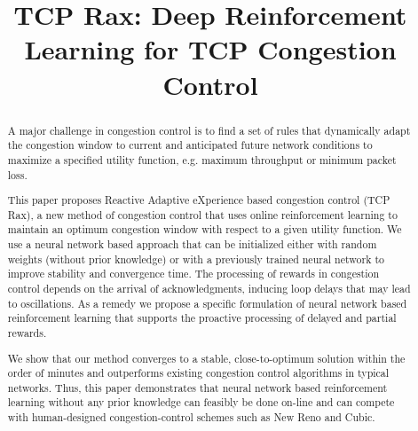\documentclass[sigconf]{acmart}
\begin{document}
\title{TCP Rax: Deep Reinforcement Learning for TCP Congestion Control}

%
%


\begin{abstract}

A major challenge in congestion control is to find a set of rules that dynamically adapt the congestion window to current and anticipated future network conditions to maximize a specified utility function, e.g. maximum throughput or minimum packet loss. 

This paper proposes Reactive Adaptive eXperience based congestion control (TCP Rax), a new method of congestion control that uses online reinforcement learning to maintain an optimum congestion window with respect to a given utility function. We use a neural network based approach that can be initialized either with random weights (without prior knowledge) or with a previously trained neural network to improve stability and convergence time. The processing of rewards in congestion control depends on the arrival of acknowledgments, inducing loop delays that may lead to oscillations. As a remedy we propose a specific formulation of neural network based reinforcement learning that supports the proactive processing of delayed and partial rewards. 

We show that our method converges to a stable, close-to-optimum solution within the order of minutes and outperforms existing congestion control algorithms in typical networks. Thus, this paper demonstrates that neural network based reinforcement learning without any prior knowledge can feasibly be done on-line and can compete with human-designed congestion-control schemes such as New Reno and Cubic.

\end{abstract}
\end{document}
